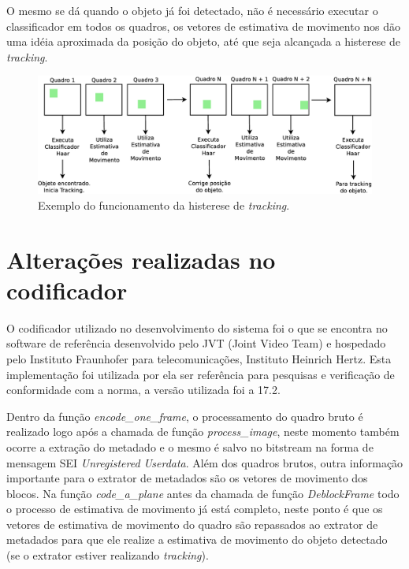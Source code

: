 \documentclass[12pt]{article}
\begin{document}
O mesmo se dá quando o objeto já foi detectado, não é necessário executar o classificador em todos os quadros, os vetores de estimativa de movimento nos dão uma idéia aproximada da posição do objeto, até que seja alcançada a histerese de \textit{tracking}.

\begin{figure}[H]
\centering
\includegraphics[scale=0.3]{../imagens/fig24.eps}
\caption{Exemplo do funcionamento da histerese de \textit{tracking}.}
\label{fig:tracking_histeresys_example_artigo}
\end{figure}


\section*{Alterações realizadas no codificador}
\label{art:codificador}

O codificador utilizado no desenvolvimento do sistema foi o que se encontra no software de referência desenvolvido pelo JVT (Joint Video Team) e hospedado pelo Instituto Fraunhofer para telecomunicações, Instituto Heinrich Hertz. Esta implementação foi utilizada por ela ser referência para pesquisas e verificação de conformidade com a norma, a versão utilizada foi a 17.2.

Dentro da função \textit{encode\_one\_frame}, o processamento do quadro bruto é realizado logo após a chamada de função \textit{process\_image}, neste momento também ocorre a extração do metadado e o mesmo é salvo no bitstream na forma de mensagem SEI \textit{Unregistered Userdata}. Além dos quadros brutos, outra informação importante para o extrator de metadados são os vetores de movimento dos blocos. Na função \textit{code\_a\_plane} antes da chamada de função \textit{DeblockFrame} todo o processo de estimativa de movimento já está completo, neste ponto é que os vetores de estimativa de movimento do quadro são repassados ao extrator de metadados para que ele realize a estimativa de movimento do objeto detectado (se o extrator estiver realizando \textit{tracking}).
\end{document}

